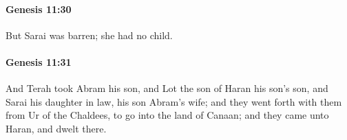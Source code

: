 		\paragraph{Genesis 11:30} %
			\label{GENESIS-11-30}

			But Sarai was barren; she had no child.


		\paragraph{Genesis 11:31} %
			\label{GENESIS-11-31}

			And Terah took Abram his son, and Lot the son of Haran his son's son, and Sarai his daughter in law, his son Abram's wife; and they went forth with them from Ur of the Chaldees, to go into the land of Canaan; and they came unto Haran, and dwelt there.


